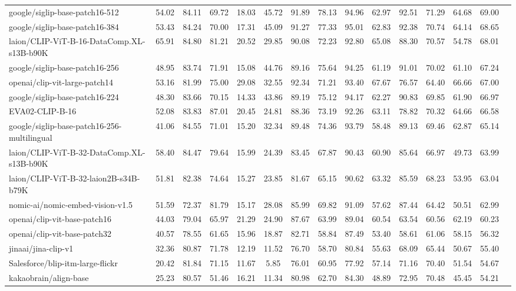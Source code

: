\begin{table*}
{\begin{tabular}{lcccccccccccccc}
google/siglip-base-patch16-512 &54.02 &84.11 &69.72 &18.03 &45.72 &91.89 &78.13 &94.96 &62.97 &92.51 &71.29 &64.68 &69.00 \\
google/siglip-base-patch16-384 &53.43 &84.24 &70.00 &17.31 &45.09 &91.27 &77.33 &95.01 &62.83 &92.38 &70.74 &64.14 &68.65 \\
laion/CLIP-ViT-B-16-DataComp.XL-s13B-b90K &65.91 &84.80 &81.21 &20.52 &29.85 &90.08 &72.23 &92.80 &65.08 &88.30 &70.57 &54.78 &68.01 \\
google/siglip-base-patch16-256 &48.95 &83.74 &71.91 &15.08 &44.76 &89.16 &75.64 &94.25 &61.19 &91.01 &70.02 &61.10 &67.24 \\
openai/clip-vit-large-patch14 &53.16 &81.99 &75.00 &29.08 &32.55 &92.34 &71.21 &93.40 &67.67 &76.57 &64.40 &66.66 &67.00 \\
google/siglip-base-patch16-224 &48.30 &83.66 &70.15 &14.33 &43.86 &89.19 &75.12 &94.17 &62.27 &90.83 &69.85 &61.90 &66.97 \\
EVA02-CLIP-B-16 &52.08 &83.83 &87.01 &20.45 &24.81 &88.36 &73.19 &92.26 &63.11 &78.82 &70.32 &64.66 &66.58 \\
google/siglip-base-patch16-256-multilingual &41.06 &84.55 &71.01 &15.20 &32.34 &89.48 &74.36 &93.79 &58.48 &89.13 &69.46 &62.87 &65.14 \\
laion/CLIP-ViT-B-32-DataComp.XL-s13B-b90K &58.40 &84.47 &79.64 &15.99 &24.39 &83.45 &67.87 &90.43 &60.90 &85.64 &66.97 &49.73 &63.99 \\
laion/CLIP-ViT-B-32-laion2B-s34B-b79K &51.81 &82.38 &74.64 &15.27 &23.85 &81.67 &65.15 &90.62 &63.32 &85.59 &68.23 &53.95 &63.04 \\
nomic-ai/nomic-embed-vision-v1.5 &51.59 &72.37 &81.79 &15.17 &28.08 &85.99 &69.82 &91.09 &57.62 &87.44 &64.42 &50.51 &62.99 \\
openai/clip-vit-base-patch16 &44.03 &79.04 &65.97 &21.29 &24.90 &87.67 &63.99 &89.04 &60.54 &63.54 &60.56 &62.19 &60.23 \\
openai/clip-vit-base-patch32 &40.57 &78.55 &61.65 &15.96 &18.87 &82.71 &58.84 &87.49 &53.40 &58.61 &61.06 &58.15 &56.32 \\
jinaai/jina-clip-v1 &32.36 &80.87 &71.78 &12.19 &11.52 &76.70 &58.70 &80.84 &55.63 &68.09 &65.44 &50.67 &55.40 \\
Salesforce/blip-itm-large-flickr &20.42 &81.84 &71.15 &11.67 &5.85 &76.01 &60.95 &77.92 &57.14 &71.16 &70.40 &51.54 &54.67 \\
kakaobrain/align-base &25.23 &80.57 &51.46 &16.21 &11.34 &80.98 &62.70 &84.30 &48.89 &72.95 &70.48 &45.45 &54.21 \\

\end{tabular}}
\end{table*}
